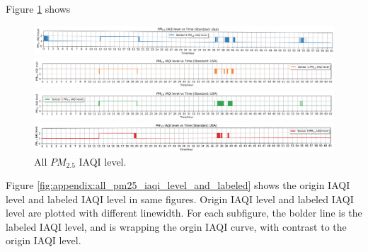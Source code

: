 Figure \ref{fig:appendix:all_pm25_iaqi_level} shows

\begin{figure}[!htbp]
    \begin{center}
        \includegraphics[width=\linewidth]{fig/iaqi_level/pm25_0_iaqi_level_dpi1200.png}
    \end{center}
    \begin{center}
        \includegraphics[width=\linewidth]{fig/iaqi_level/pm25_1_iaqi_level_dpi1200.png}
    \end{center}
    \begin{center}
        \includegraphics[width=\linewidth]{fig/iaqi_level/pm25_2_iaqi_level_dpi1200.png}
    \end{center}
    \begin{center}
        \includegraphics[width=\linewidth]{fig/iaqi_level/pm25_3_iaqi_level_dpi1200.png}
    \end{center}
    \caption{All $PM_{2.5}$ IAQI level.}
    \label{fig:appendix:all_pm25_iaqi_level}
\end{figure}

Figure \ref{fig:appendix:all_pm25_iaqi_level_and_labeled} shows the origin IAQI level and labeled IAQI level in same figures. Origin IAQI level and labeled IAQI level are plotted with different linewidth. For each subfigure, the bolder line is the labeled IAQI level, and is wrapping the orgin IAQI curve, with contrast to the origin IAQI level.


